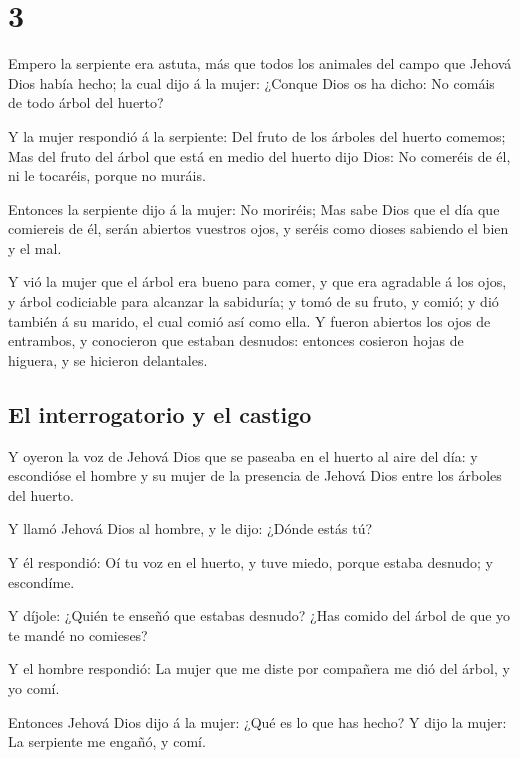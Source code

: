 \hypertarget{section-2}{%
\section{3}\label{section-2}}

 Empero la serpiente era astuta, más que todos los animales
del campo que Jehová Dios había hecho; la cual dijo á la mujer: ¿Conque
Dios os ha dicho: No comáis de todo árbol del huerto?

 Y la mujer respondió á la serpiente: Del fruto de los
árboles del huerto comemos;  Mas del fruto del árbol que
está en medio del huerto dijo Dios: No comeréis de él, ni le tocaréis,
porque no muráis.

 Entonces la serpiente dijo á la mujer: No moriréis;
 Mas sabe Dios que el día que comiereis de él, serán
abiertos vuestros ojos, y seréis como dioses sabiendo el bien y el mal.

 Y vió la mujer que el árbol era bueno para comer, y que era
agradable á los ojos, y árbol codiciable para alcanzar la sabiduría; y
tomó de su fruto, y comió; y dió también á su marido, el cual comió así
como ella.  Y fueron abiertos los ojos de entrambos, y
conocieron que estaban desnudos: entonces cosieron hojas de higuera, y
se hicieron delantales.

\hypertarget{el-interrogatorio-y-el-castigo}{%
\subsection{El interrogatorio y el
castigo}\label{el-interrogatorio-y-el-castigo}}

 Y oyeron la voz de Jehová Dios que se paseaba en el huerto
al aire del día: y escondióse el hombre y su mujer de la presencia de
Jehová Dios entre los árboles del huerto.

 Y llamó Jehová Dios al hombre, y le dijo: ¿Dónde estás tú?

 Y él respondió: Oí tu voz en el huerto, y tuve miedo,
porque estaba desnudo; y escondíme.

 Y díjole: ¿Quién te enseñó que estabas desnudo? ¿Has
comido del árbol de que yo te mandé no comieses?

 Y el hombre respondió: La mujer que me diste por compañera
me dió del árbol, y yo comí.

 Entonces Jehová Dios dijo á la mujer: ¿Qué es lo que has
hecho? Y dijo la mujer: La serpiente me engañó, y comí.

